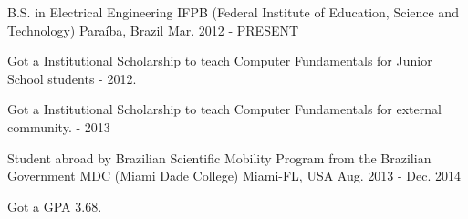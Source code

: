 

\begin{cventries}

  \cventry
    {B.S. in Electrical Engineering} %
    {IFPB (Federal Institute of Education, Science and Technology)} %
    {Paraíba, Brazil} %
    {Mar. 2012 - PRESENT} %
    {
      \begin{cvitems} %
        \item {Got a Institutional Scholarship to teach Computer Fundamentals for Junior School students - 2012.}
        \item {Got a Institutional Scholarship to teach Computer Fundamentals for external community. - 2013}
      \end{cvitems}
    }
    
    \cventry
    {Student abroad by Brazilian Scientific Mobility Program from the Brazilian Government} %
    {MDC (Miami Dade College)} %
    {Miami-FL, USA} %
    {Aug. 2013 - Dec. 2014} %
    {
		\begin{cvitems} %
        \item {Got a GPA 3.68.}  
        \end{cvitems} 
    }

\end{cventries}

